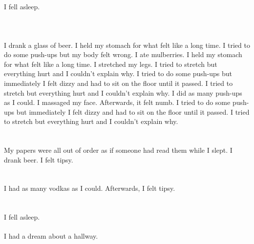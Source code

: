 \documentclass{article}
\begin{document}
    \section{}
    I fell asleep.\\\\ 
    \newpage
    
    \section{}
    I drank a glass of beer. I held my stomach for what felt like a long time. I tried to do some push-ups but my body felt wrong. I ate mulberries. I held my stomach for what felt like a long time.  I stretched my legs.  I tried to stretch but everything hurt and I couldn't explain why.  I tried to do some push-ups but immediately I felt dizzy and had to sit on the floor until it passed.  I tried to stretch but everything hurt and I couldn't explain why.   I did as many push-ups as I could.  I massaged my face. Afterwards, it felt numb.  I tried to do some push-ups but immediately I felt dizzy and had to sit on the floor until it passed.  I tried to stretch but everything hurt and I couldn't explain why.  
    \newpage
    
    \section{}
    My papers were all out of order as if someone had read them while I slept. I drank beer. I felt tipsy.  
    \newpage
    
    \section{}
    I had as many vodkas as I could. Afterwards, I felt tipsy.  
    \newpage
    
    \section{}
    I fell asleep.\\\\I had a dream about a hallway.\\\\ 
    \newpage
    
\end{document}
